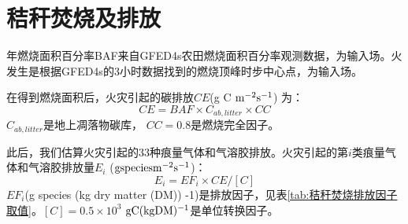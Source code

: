 \section{秸秆焚烧及排放}
年燃烧面积百分率BAF来自GFED4s农田燃烧面积百分率观测数据，为输入场。火发生是根据GFED4s的3小时数据找到的燃烧顶峰时步中心点，为输入场。

在得到燃烧面积后，火灾引起的碳排放$CE$(g C $\rm m^{-2} s^{-1}$) 为：
\begin{equation}
CE=BAF \times C_{ab,litter} \times CC
\end{equation}
$C_{ab,litter}$是地上凋落物碳库， $CC=0.8$是燃烧完全因子。

此后，我们估算火灾引起的33种痕量气体和气溶胶排放。火灾引起的第$i$类痕量气体和气溶胶排放量$E_i$ ($\rm g species m^{-2} s^{-1}$)：
\begin{equation}
E_{i}=EF_{i} \times CE /[{C}]
\end{equation}
$EF_i$(g species (kg dry matter (DM)) -1)是排放因子，见表\ref{tab:秸秆焚烧排放因子取值}。$[C]=0.5×10^3$ $\rm g C (kg DM)^{-1}$是单位转换因子。


